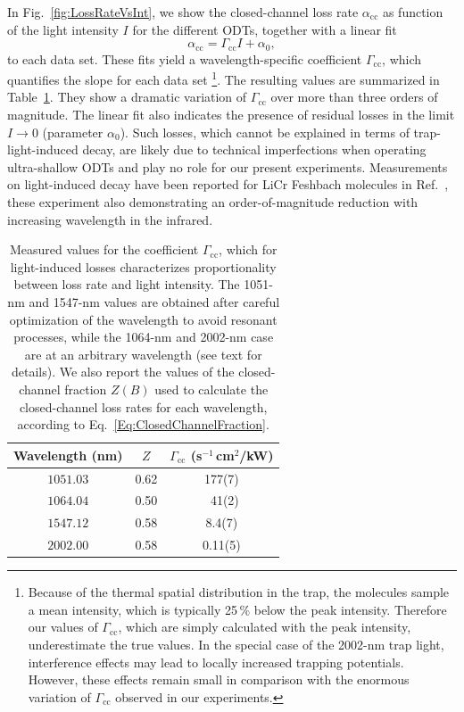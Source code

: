 In Fig.~\ref{fig:LossRateVsInt}, we show the closed-channel loss rate $\alpha_{\textrm{cc}}$ as function of the light intensity $I$ for the different ODTs, together with a linear fit
\begin{equation}
	\alpha_{\textrm{cc}}=\Gamma_{\textrm{cc}}I+\alpha_0,
	\label{eq:LinFit}
\end{equation}
to each data set. These fits yield a wavelength-specific coefficient $\Gamma_{\mathrm{cc}}$, which quantifies the slope for each data set \footnote{Because of the thermal spatial distribution in the trap, the molecules sample a mean intensity, which is typically 25$\,\%$ below the peak intensity. Therefore our values of $\Gamma_{\mathrm{cc}}$, which are simply calculated with the peak intensity, underestimate the true values. {In the special case of the 2002-nm trap light, interference effects may lead to locally increased trapping potentials. However, these effects remain small in comparison with the enormous variation of $\Gamma_{\mathrm{cc}}$ observed in our experiments.}}. 
The resulting values are summarized in Table~\ref{tab:Coeff}. They show a dramatic variation of $\Gamma_{\textrm{cc}}$ over more than three orders of magnitude. {The linear fit also indicates the presence of residual losses in the limit $I\rightarrow 0$ (parameter $\alpha_0$). Such losses, which cannot be explained in terms of trap-light-induced decay, are likely due to technical imperfections when operating ultra-shallow ODTs and play no role for our present experiments.}
Measurements on light-induced decay have been reported for LiCr Feshbach molecules in Ref.~\cite{Finelli2024ula}, these experiment also demonstrating an order-of-magnitude reduction with increasing wavelength in the infrared. 

\begin{table}[]
	\caption{Measured values for the coefficient $\Gamma_{\mathrm{cc}}$, which for light-induced losses characterizes proportionality between loss rate and light intensity. The 1051-nm and 1547-nm values are obtained after careful optimization of the wavelength to avoid resonant processes, while the 1064-nm and 2002-nm case are at an arbitrary wavelength (see text for details). We also report the values of the closed-channel fraction $Z(B)$ used to calculate the closed-channel loss rates for each wavelength, according to Eq.~\eqref{Eq:ClosedChannelFraction}.}
	
	\medskip
	\begin{center}
		\begin{tabular}{ccc}
		\hline
		\hline
		Wavelength (nm) \qquad&  $Z$ \qquad& $\Gamma_{\mathrm{cc}}$ (s$^{-1}$\,cm$^{2}$/kW) \\
		\hline
		$1051.03$     & 0.62    &  177(7) \\
		$1064.04$ &  0.50 & \   41(2)\\
		$1547.12$& 0.58 & 8.4(7) \\
		$2002.00$ & 0.58 &   0.11(5)\\
		\hline
		\hline
		\end{tabular}
	\end{center}

	\label{tab:Coeff}
\end{table}

